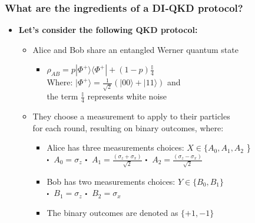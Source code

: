 \documentclass{beamer}
\newcommand\sbullet[1][.5]{\mathbin{\vcenter{\hbox{\scalebox{#1}{$\bullet$}}}}}
\begin{document}
    \begin{frame}
        \frametitle{\large What are the ingredients of a DI‑QKD protocol?}

        \vspace{3ex}
        \begin{itemize}
            \item \textbf{Let's consider the following QKD protocol:}
            \begin{itemize}
                \item Alice and Bob share an entangled Werner quantum state
                \begin{itemize}
                    \small
                    \item ${\rho}_{AB} = p|{\Phi}^{+}\rangle\langle{\Phi}^{+}| + (1 - p) \frac{\mathbb{I}}{4}$\\
                    \vspace{1ex}\hspace{0.5em}Where: $|{\Phi}^{+}\rangle = \frac{1}{\sqrt{2}}(|00\rangle + |11\rangle)$ and\\\hspace{3.75em}the term $\frac{\mathbb{I}}{4}$ represents white noise 
                \end{itemize}
                \vspace{1ex}
                \item They choose a measurement to apply to their particles\\ for each round, resulting on binary outcomes, where:
                \begin{itemize}
                    \item Alice has three measurements choices: $X \in \{ {A}_{0}, {A}_{1}, {A}_{2}$ \}\\
                    $\sbullet$\, ${A}_{0} = {\sigma}_{z}$ \hspace{1.25ex} $\sbullet$\, ${A}_{1} = \frac{({\sigma}_{z} + {\sigma}_{x})}{\sqrt{2}}$ \hspace{1.25ex} $\sbullet$\, ${A}_{2} = \frac{({\sigma}_{z} - {\sigma}_{x})}{\sqrt{2}}$
                    \item Bob has two measurements choices: $Y \in \{ {B}_{0}, {B}_{1} \}$\\
                    $\sbullet$\, ${B}_{1} = {\sigma}_{z}$ \hspace{1.25ex} $\sbullet$\, ${B}_{2} = {\sigma}_{x}$
                    \item The binary outcomes are denoted as $\{+1 ,-1\}$
                \end{itemize}
            \end{itemize}
        \end{itemize}
    \end{frame}
\end{document}

